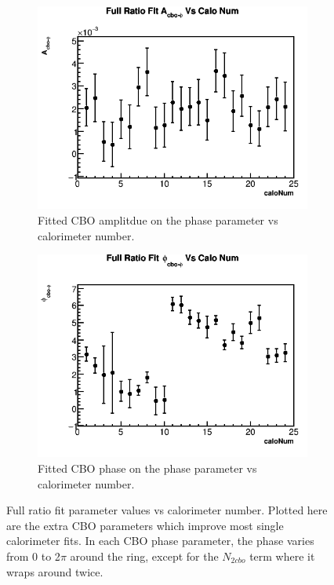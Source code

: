 \begin{figure}[h]
\begin{subfigure}[t]{0.4\textwidth}
	    \end{subfigure}%
	    \vspace{4mm}
	    \begin{subfigure}[t]{0.4\textwidth}
		    \centering
			\includegraphics[width=\textwidth]{RatioCBOFit_A_cbo-phi_Vs_Calo_Canv}
		    \caption{Fitted CBO amplitdue on the \gmtwo phase parameter vs calorimeter number.}
	    \end{subfigure}
	    \hspace{4mm}
	    \begin{subfigure}[t]{0.4\textwidth}
		    \centering
			\includegraphics[width=\textwidth]{RatioCBOFit_phi_cbo-phi_Vs_Calo_Canv}
		    \caption{Fitted CBO phase on the \gmtwo phase parameter vs calorimeter number.}
	    \end{subfigure}%
	\caption[PerCaloPlotsExtraCBOParams]{Full ratio fit parameter values vs calorimeter number. Plotted here are the extra CBO parameters which improve most single calorimeter fits. In each CBO phase parameter, the phase varies from 0 to 2$\pi$ around the ring, except for the $N_{2cbo}$ term where it wraps around twice.}
	\label{fig:PerCaloPlotsExtraCBOParams}
	\end{figure}


